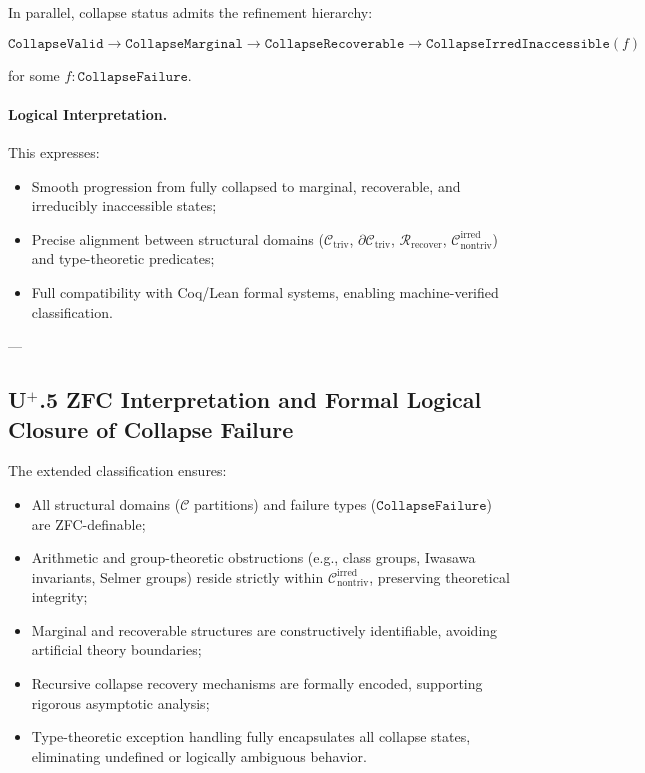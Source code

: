 \documentclass[11pt]{article}
\begin{document}
In parallel, collapse status admits the refinement hierarchy:

\[
\texttt{CollapseValid} \to \texttt{CollapseMarginal} \to \texttt{CollapseRecoverable} \to \texttt{CollapseIrredInaccessible}(f)
\]

for some $f : \texttt{CollapseFailure}$.

\paragraph{Logical Interpretation.}

This expresses:

\begin{itemize}
    \item Smooth progression from fully collapsed to marginal, recoverable, and irreducibly inaccessible states;
    \item Precise alignment between structural domains ($\mathcal{C}_{\mathrm{triv}}$, $\partial \mathcal{C}_{\mathrm{triv}}$, $\mathcal{R}_{\mathrm{recover}}$, $\mathcal{C}_{\mathrm{nontriv}}^{\mathrm{irred}}$) and type-theoretic predicates;
    \item Full compatibility with Coq/Lean formal systems, enabling machine-verified classification.
\end{itemize}

---

\subsection*{U$^{+}$.5 ZFC Interpretation and Formal Logical Closure of Collapse Failure}

The extended classification ensures:

\begin{itemize}
    \item All structural domains ($\mathcal{C}$ partitions) and failure types ($\texttt{CollapseFailure}$) are ZFC-definable;
    \item Arithmetic and group-theoretic obstructions (e.g., class groups, Iwasawa invariants, Selmer groups) reside strictly within $\mathcal{C}_{\mathrm{nontriv}}^{\mathrm{irred}}$, preserving theoretical integrity;
    \item Marginal and recoverable structures are constructively identifiable, avoiding artificial theory boundaries;
    \item Recursive collapse recovery mechanisms are formally encoded, supporting rigorous asymptotic analysis;
    \item Type-theoretic exception handling fully encapsulates all collapse states, eliminating undefined or logically ambiguous behavior.
\end{itemize}
\end{document}
